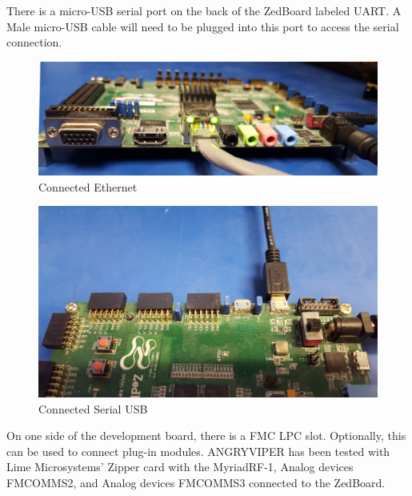 \begin{flushleft}
There is a micro-USB serial port on the back of the ZedBoard labeled UART. A Male micro-USB cable will need to be plugged into this port to access the serial connection.
\begin{figure}[ht]
	\centerline{\includegraphics[scale=0.05]{zed_ether}}
	\caption{Connected Ethernet}
	\label{fig:zed_ether}
\end{figure}
\begin{figure}[ht]
	\centerline{\includegraphics[scale=0.05]{zed_uart}}
	\caption{Connected Serial USB}
	\label{fig:zed_uart}
\end{figure}

\newpage
On one side of the development board, there is a FMC LPC slot. Optionally, this can be used to connect plug-in modules. ANGRYVIPER has been tested with Lime Microsystems' Zipper card with the MyriadRF-1, Analog devices FMCOMMS2, and Analog devices FMCOMMS3 connected to the ZedBoard.\\   \bigskip


\end{flushleft}
